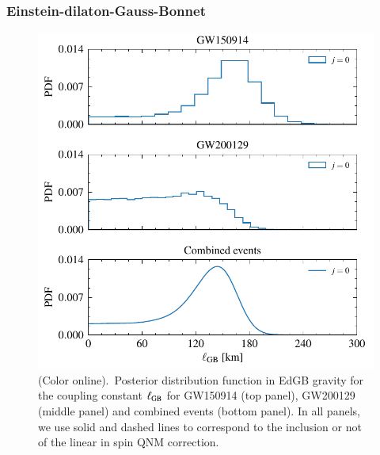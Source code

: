 \documentclass[twocolumn,
               prd,
               aps,
               superscriptaddress,
               tightenlines,
               nofootinbib,
               eqsecnum,
               amsfonts,
               amsmath,
               longbibliography]{revtex4-1}
\begin{document}
\subsubsection{Einstein-dilaton-Gauss-Bonnet}
\label{sec:results_edgb}

\begin{figure}[t]
\includegraphics[width=\columnwidth]{figs/edgb_posteriors_combined.pdf}
\caption{(Color online).~Posterior distribution function in EdGB gravity
for the coupling constant $\ell_{\rm GB}$ for GW150914 (top panel), GW200129 (middle panel)
and combined events (bottom panel).
%
In all panels, we use solid and dashed lines to correspond to the inclusion or not of the linear
in spin QNM correction.}
\label{fig:sGB_exec_sum}
\end{figure}
\end{document}

